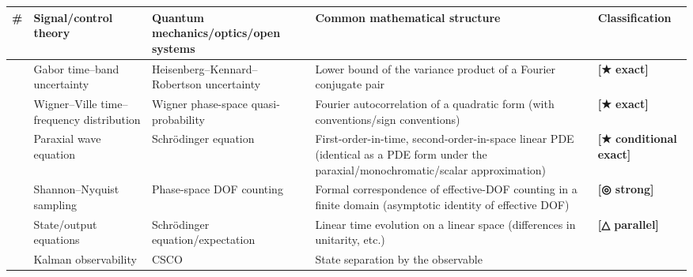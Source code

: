 \documentclass[
]{article}
\newcounter{none} %
\begin{document}
{\def\LTcaptype{none} %
\begin{longtable}[]{@{}
  >{\raggedright\arraybackslash}p{}
  >{\raggedright\arraybackslash}p{}
  >{\raggedright\arraybackslash}p{}
  >{\raggedright\arraybackslash}p{}
  >{\raggedright\arraybackslash}p{}@{}}
\toprule\noalign{}
\begin{minipage}[b]{\linewidth}\raggedright
\#
\end{minipage} & \begin{minipage}[b]{\linewidth}\raggedright
Signal/control theory
\end{minipage} & \begin{minipage}[b]{\linewidth}\raggedright
Quantum mechanics/optics/open systems
\end{minipage} & \begin{minipage}[b]{\linewidth}\raggedright
Common mathematical structure
\end{minipage} & \begin{minipage}[b]{\linewidth}\raggedright
Classification
\end{minipage} \\
\midrule\noalign{}
\endhead
\bottomrule\noalign{}
\endlastfoot
1 & Gabor time--band uncertainty & Heisenberg--Kennard--Robertson
uncertainty & Lower bound of the variance product of a Fourier conjugate
pair & \textbf{{[}★ exact{]}} \\
2 & Wigner--Ville time--frequency distribution & Wigner phase-space
quasi-probability & Fourier autocorrelation of a quadratic form (with
conventions/sign conventions) & \textbf{{[}★ exact{]}} \\
3 & Paraxial wave equation & Schrödinger equation & First-order-in-time,
second-order-in-space linear PDE (identical as a PDE form under the
paraxial/monochromatic/scalar approximation) & \textbf{{[}★ conditional
exact{]}} \\
4 & Shannon--Nyquist sampling & Phase-space DOF counting & Formal
correspondence of effective-DOF counting in a finite domain (asymptotic
identity of effective DOF) & \textbf{{[}◎ strong{]}} \\
5 & State/output equations & Schrödinger equation/expectation & Linear
time evolution on a linear space (differences in unitarity, etc.) &
\textbf{{[}△ parallel{]}} \\
6 & Kalman observability & CSCO & State separation by the observable

\end{longtable}}
\end{document}
